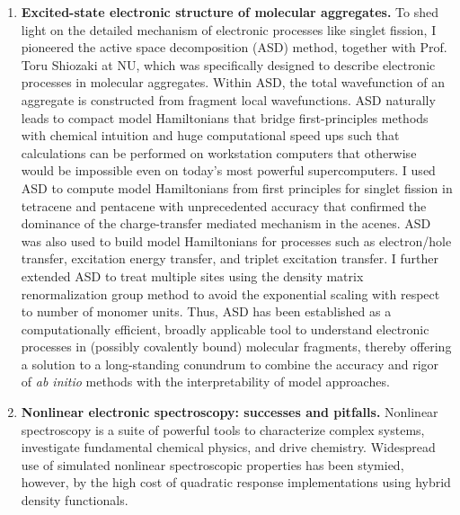 \documentclass{nihbiosketch}
\begin{document}
\begin{enumerate}
  \item \begin{bibunit}[nih]
  \textbf{Excited-state electronic structure of molecular aggregates.}
  To shed light on the detailed mechanism of electronic processes like singlet fission,
  I pioneered the active space decomposition (ASD) method, together
  with Prof. Toru Shiozaki at NU, which was specifically designed to describe electronic processes
  in molecular aggregates.\cite{Parker2013JCP021108} Within ASD, the total wavefunction of an aggregate is
  constructed from fragment local wavefunctions.\cite{Parker2013JCP021108} ASD naturally leads to
  compact model Hamiltonians that bridge first-principles methods with chemical intuition and huge
  computational speed ups such that calculations can be performed on workstation computers
  that otherwise would be impossible even on today's most powerful supercomputers.
  I used ASD to compute model Hamiltonians from first principles for singlet fission in tetracene and pentacene
  with unprecedented accuracy that confirmed the dominance of the charge-transfer mediated mechanism
  in the acenes.\cite{Parker2014JPCC12700}
  ASD was also used to build model Hamiltonians
  for processes such as electron/hole transfer, excitation energy transfer, and triplet excitation transfer.\cite{Parker2014JCTC3738}
  I further extended ASD to treat multiple sites using the density matrix renormalization group method
  to avoid the exponential scaling with respect to number of monomer units.\cite{Parker2014JCP211102}
  Thus, ASD has been established as a computationally efficient, broadly applicable tool to understand
  electronic processes in (possibly covalently bound) molecular fragments, thereby offering a solution
  to a long-standing conundrum to combine the accuracy and rigor of \textit{ab initio} methods with
  the interpretability of model approaches.

  \renewcommand{\refname}{\vspace{-2em}}
  \end{bibunit}

\pagebreak
  \item \begin{bibunit}[nih]
  \textbf{Nonlinear electronic spectroscopy: successes and pitfalls.}
  Nonlinear spectroscopy is a suite of powerful tools to characterize complex systems, investigate fundamental chemical
  physics, and drive chemistry. Widespread use of simulated nonlinear spectroscopic
  properties has been stymied, however, by the high cost of quadratic response implementations using hybrid density
  functionals.


\end{bibunit}
\end{enumerate}
\end{document}
